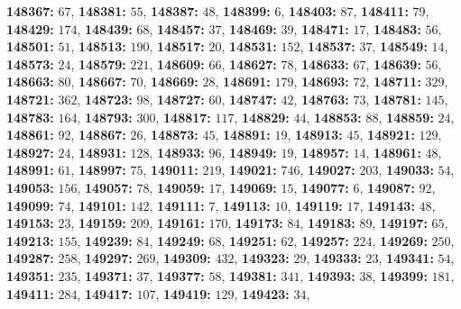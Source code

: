 \textsf{\bfseries 148367:} $67$, \textsf{\bfseries 148381:} $55$, \textsf{\bfseries 148387:} $48$, \textsf{\bfseries 148399:} $6$, \textsf{\bfseries 148403:} $87$, \textsf{\bfseries 148411:} $79$, \textsf{\bfseries 148429:} $174$, \textsf{\bfseries 148439:} $68$, \textsf{\bfseries 148457:} $37$, \textsf{\bfseries 148469:} $39$, \textsf{\bfseries 148471:} $17$, \textsf{\bfseries 148483:} $56$, \textsf{\bfseries 148501:} $51$, \textsf{\bfseries 148513:} $190$, \textsf{\bfseries 148517:} $20$, \textsf{\bfseries 148531:} $152$, \textsf{\bfseries 148537:} $37$, \textsf{\bfseries 148549:} $14$, \textsf{\bfseries 148573:} $24$, \textsf{\bfseries 148579:} $221$, \textsf{\bfseries 148609:} $66$, \textsf{\bfseries 148627:} $78$, \textsf{\bfseries 148633:} $67$, \textsf{\bfseries 148639:} $56$, \textsf{\bfseries 148663:} $80$, \textsf{\bfseries 148667:} $70$, \textsf{\bfseries 148669:} $28$, \textsf{\bfseries 148691:} $179$, \textsf{\bfseries 148693:} $72$, \textsf{\bfseries 148711:} $329$, \textsf{\bfseries 148721:} $362$, \textsf{\bfseries 148723:} $98$, \textsf{\bfseries 148727:} $60$, \textsf{\bfseries 148747:} $42$, \textsf{\bfseries 148763:} $73$, \textsf{\bfseries 148781:} $145$, \textsf{\bfseries 148783:} $164$, \textsf{\bfseries 148793:} $300$, \textsf{\bfseries 148817:} $117$, \textsf{\bfseries 148829:} $44$, \textsf{\bfseries 148853:} $88$, \textsf{\bfseries 148859:} $24$, \textsf{\bfseries 148861:} $92$, \textsf{\bfseries 148867:} $26$, \textsf{\bfseries 148873:} $45$, \textsf{\bfseries 148891:} $19$, \textsf{\bfseries 148913:} $45$, \textsf{\bfseries 148921:} $129$, \textsf{\bfseries 148927:} $24$, \textsf{\bfseries 148931:} $128$, \textsf{\bfseries 148933:} $96$, \textsf{\bfseries 148949:} $19$, \textsf{\bfseries 148957:} $14$, \textsf{\bfseries 148961:} $48$, \textsf{\bfseries 148991:} $61$, \textsf{\bfseries 148997:} $75$, \textsf{\bfseries 149011:} $219$, \textsf{\bfseries 149021:} $746$, \textsf{\bfseries 149027:} $203$, \textsf{\bfseries 149033:} $54$, \textsf{\bfseries 149053:} $156$, \textsf{\bfseries 149057:} $78$, \textsf{\bfseries 149059:} $17$, \textsf{\bfseries 149069:} $15$, \textsf{\bfseries 149077:} $6$, \textsf{\bfseries 149087:} $92$, \textsf{\bfseries 149099:} $74$, \textsf{\bfseries 149101:} $142$, \textsf{\bfseries 149111:} $7$, \textsf{\bfseries 149113:} $10$, \textsf{\bfseries 149119:} $17$, \textsf{\bfseries 149143:} $48$, \textsf{\bfseries 149153:} $23$, \textsf{\bfseries 149159:} $209$, \textsf{\bfseries 149161:} $170$, \textsf{\bfseries 149173:} $84$, \textsf{\bfseries 149183:} $89$, \textsf{\bfseries 149197:} $65$, \textsf{\bfseries 149213:} $155$, \textsf{\bfseries 149239:} $84$, \textsf{\bfseries 149249:} $68$, \textsf{\bfseries 149251:} $62$, \textsf{\bfseries 149257:} $224$, \textsf{\bfseries 149269:} $250$, \textsf{\bfseries 149287:} $258$, \textsf{\bfseries 149297:} $269$, \textsf{\bfseries 149309:} $432$, \textsf{\bfseries 149323:} $29$, \textsf{\bfseries 149333:} $23$, \textsf{\bfseries 149341:} $54$, \textsf{\bfseries 149351:} $235$, \textsf{\bfseries 149371:} $37$, \textsf{\bfseries 149377:} $58$, \textsf{\bfseries 149381:} $341$, \textsf{\bfseries 149393:} $38$, \textsf{\bfseries 149399:} $181$, \textsf{\bfseries 149411:} $284$, \textsf{\bfseries 149417:} $107$, \textsf{\bfseries 149419:} $129$, \textsf{\bfseries 149423:} $34$, 
